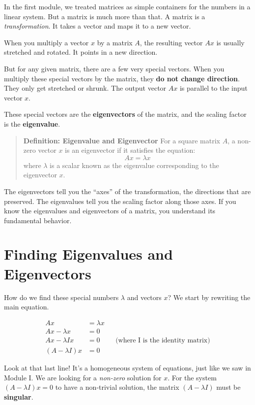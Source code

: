 \documentclass[
  letterpaper,
  DIV=11,
  numbers=noendperiod]{scrreprt}
\begin{document}
In the first module, we treated matrices as simple containers for the
numbers in a linear system. But a matrix is much more than that. A
matrix is a \emph{transformation}. It takes a vector and maps it to a
new vector.

When you multiply a vector \(x\) by a matrix \(A\), the resulting vector
\(Ax\) is usually stretched and rotated. It points in a new direction.

But for any given matrix, there are a few very special vectors. When you
multiply these special vectors by the matrix, they \textbf{do not change
direction}. They only get stretched or shrunk. The output vector \(Ax\)
is parallel to the input vector \(x\).

These special vectors are the \textbf{eigenvectors} of the matrix, and
the scaling factor is the \textbf{eigenvalue}.

\begin{quote}
\textbf{Definition: Eigenvalue and Eigenvector} For a square matrix
\(A\), a non-zero vector \(x\) is an eigenvector if it satisfies the
equation: \[ Ax = \lambda x \] where \(\lambda\) is a scalar known as
the eigenvalue corresponding to the eigenvector \(x\).
\end{quote}

The eigenvectors tell you the ``axes'' of the transformation, the
directions that are preserved. The eigenvalues tell you the scaling
factor along those axes. If you know the eigenvalues and eigenvectors of
a matrix, you understand its fundamental behavior.

\section{Finding Eigenvalues and
Eigenvectors}\label{finding-eigenvalues-and-eigenvectors}

How do we find these special numbers \(\lambda\) and vectors \(x\)? We
start by rewriting the main equation.

\[
\begin{align*}
Ax &= \lambda x \\
Ax - \lambda x &= 0 \\
Ax - \lambda I x &= 0 && \text{(where I is the identity matrix)} \\
(A - \lambda I)x &= 0
\end{align*}
\]

Look at that last line! It's a homogeneous system of equations, just
like we saw in Module I. We are looking for a \emph{non-zero} solution
for \(x\). For the system \((A - \lambda I)x = 0\) to have a non-trivial
solution, the matrix \((A - \lambda I)\) must be \textbf{singular}.
\end{document}
